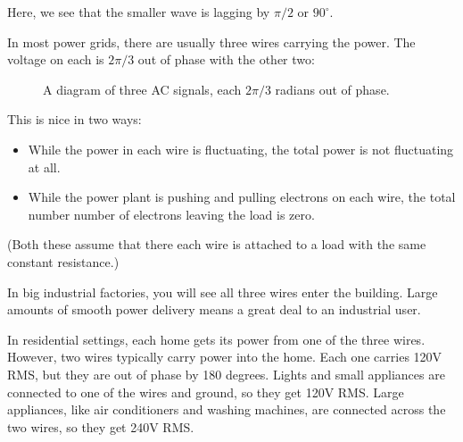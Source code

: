 Here, we see that the smaller wave is lagging by $\pi/2$ or $90^\circ$.

In most power grids, there are usually three wires carrying the power.
The voltage on each is $2\pi/3$ out of phase with the other two:
\begin{figure}[htbp]
    \centering
    \caption{A diagram of three AC signals, each $2\pi/3$ radians out of phase.}
    \label{fig:ACphase}
\end{figure}

This is nice in two ways:
\begin{itemize}
\item While the power in each wire is fluctuating, the total power is not fluctuating at all.
\item While the power plant is pushing and pulling electrons on each
  wire, the total number number of electrons leaving the load is zero.
\end{itemize}
(Both these assume that there each wire is attached to a load with the same constant resistance.)

In big industrial factories, you will see all three wires enter the
building. Large amounts of smooth power delivery means a great deal to an
industrial user.

In residential settings, each home gets its power from one of the three
wires. However, two wires typically carry power into the home. Each
one carries 120V RMS, but they are out of phase by 180 degrees. Lights
and small appliances are connected to one of the wires and ground, so
they get 120V RMS. Large appliances, like air conditioners and
washing machines, are connected across the two wires, so they get 240V
RMS.

